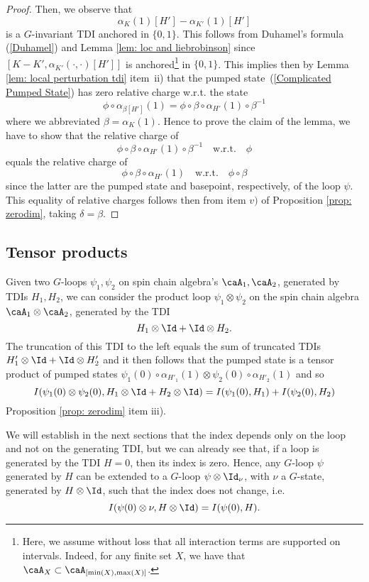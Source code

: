 \begin{proof}
	Then, we observe that 
	$$
	\alpha_{K}(1)[H']-\alpha_{K'}(1)[H']
	$$
	is a $G$-invariant TDI anchored in $\{0,1\}$. This follows from Duhamel's formula (\ref{Duhamel}) and Lemma \ref{lem: loc and liebrobinson} since $[K-K',\alpha_{K'}(\cdot,\cdot)[H']]$ is anchored\footnote{Here, we assume without loss that all interaction terms are supported on intervals. Indeed, for any finite set $X$, we have that $\caA_X\subset\caA_{[\min(X),\max(X)]}$.} in $\{0,1\}$. This implies then by Lemma \ref{lem: local perturbation tdi} item~ii) that the pumped state~(\ref{Complicated Pumped State}) has zero relative charge w.r.t. the state
	$$
	\phi \circ \alpha_{\beta[H']}(1)= \phi \circ \beta \circ \alpha_{H'}(1) \circ \beta^{-1}
	$$
	where we abbreviated $\beta=\alpha_{K}(1)$. 
	Hence to prove the claim of the lemma, we have to show that the relative charge of 
	$$
	\phi\circ \beta \circ \alpha_{H'}(1)\circ \beta^{-1}  \quad \text{w.r.t.}\quad \phi
	$$
	equals the relative charge of 
	$$
	\phi\circ \beta \circ \alpha_{H'}(1)  \quad \text{w.r.t.}\quad \phi\circ \beta
	$$
	since the latter are the pumped state and basepoint, respectively, of the loop $\psi$.
	This equality of relative charges follows then from item $v)$ of Proposition \ref{prop: zerodim}, taking $\delta=\beta$.
\end{proof}


\subsection{Tensor products}\label{sec: tensor products}

Given two $G$-loops $\psi_1,\psi_2$ on spin chain algebra's $\caA_1,\caA_2$, generated by TDIs $H_1,H_2$, we can consider the product loop 
$
\psi_1 \otimes\psi_2
$
on the spin chain algebra $\caA_1\otimes\caA_2$,
generated by the TDI
$$
H_1\otimes \Id +\Id \otimes H_2.
$$
The truncation of this TDI to the left equals the sum of truncated TDIs $H'_1\otimes \Id + \Id \otimes H'_2$ and it then follows that the pumped state is a tensor product of pumped states 
$
\psi_1(0) \circ\alpha_{H'_1}(1) \otimes \psi_2(0) \circ\alpha_{H'_2}(1)
$ and so
$$
I(\psi_1(0) \otimes \psi_2(0),H_1\otimes \Id +H_2\otimes \Id ) =
I(\psi_1(0),H_1 ) + I(\psi_2(0),H_2) 
$$
Proposition \ref{prop: zerodim} item iii).

We will establish in the next sections that the index depends only on the loop and not on the generating TDI, but we can already see that, if a loop is generated by the TDI $H=0$, then its index is zero. Hence, any $G$-loop $\psi$  generated by $H$ can be extended to a $G$-loop  $\psi\otimes \Id_\nu$, with $\nu$ a $G$-state, generated by $H\otimes\Id$, such that the index does not change, i.e.\
\begin{equation} \label{eq: index adjoining constant loop}
I(\psi(0)\otimes\nu,H\otimes \Id)=I(\psi(0) ,H).
\end{equation}

